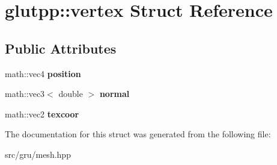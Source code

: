 \hypertarget{structglutpp_1_1vertex}{\section{glutpp\-:\-:vertex \-Struct \-Reference}
\label{structglutpp_1_1vertex}
}
\subsection*{\-Public \-Attributes}
\begin{DoxyCompactItemize}
\item 
\hypertarget{structglutpp_1_1vertex_a198bfecf87d469a394bec7a546b63054}{math\-::vec4 {\bfseries position}}\label{structglutpp_1_1vertex_a198bfecf87d469a394bec7a546b63054}

\item 
\hypertarget{structglutpp_1_1vertex_a8ea4568ed3f49a290d3a05692f22f270}{math\-::vec3$<$ double $>$ {\bfseries normal}}\label{structglutpp_1_1vertex_a8ea4568ed3f49a290d3a05692f22f270}

\item 
\hypertarget{structglutpp_1_1vertex_ae7107200078411372af280a56c874e2d}{math\-::vec2 {\bfseries texcoor}}\label{structglutpp_1_1vertex_ae7107200078411372af280a56c874e2d}

\end{DoxyCompactItemize}


\-The documentation for this struct was generated from the following file\-:\begin{DoxyCompactItemize}
\item 
src/gru/mesh.\-hpp\end{DoxyCompactItemize}
